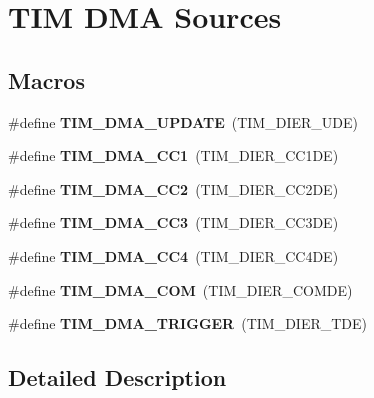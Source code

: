 \hypertarget{group___t_i_m___d_m_a__sources}{}\section{T\+IM D\+MA Sources}
\label{group___t_i_m___d_m_a__sources}
\subsection*{Macros}
\begin{DoxyCompactItemize}
\item 
\mbox{\label{group___t_i_m___d_m_a__sources_ga45816ad15a4f533027eb202ac0b9aaf5}} 
\#define {\bfseries T\+I\+M\+\_\+\+D\+M\+A\+\_\+\+U\+P\+D\+A\+TE}~(T\+I\+M\+\_\+\+D\+I\+E\+R\+\_\+\+U\+DE)
\item 
\mbox{\label{group___t_i_m___d_m_a__sources_ga33b93e8bb82fe8e167b9e9c962c54f83}} 
\#define {\bfseries T\+I\+M\+\_\+\+D\+M\+A\+\_\+\+C\+C1}~(T\+I\+M\+\_\+\+D\+I\+E\+R\+\_\+\+C\+C1\+DE)
\item 
\mbox{\label{group___t_i_m___d_m_a__sources_ga792f73196a8e7424655592097d7a3fd5}} 
\#define {\bfseries T\+I\+M\+\_\+\+D\+M\+A\+\_\+\+C\+C2}~(T\+I\+M\+\_\+\+D\+I\+E\+R\+\_\+\+C\+C2\+DE)
\item 
\mbox{\label{group___t_i_m___d_m_a__sources_ga3eb2dadbd3109bced45935fb53deeee1}} 
\#define {\bfseries T\+I\+M\+\_\+\+D\+M\+A\+\_\+\+C\+C3}~(T\+I\+M\+\_\+\+D\+I\+E\+R\+\_\+\+C\+C3\+DE)
\item 
\mbox{\label{group___t_i_m___d_m_a__sources_ga59495cf79894dfe5e5b2029863aed956}} 
\#define {\bfseries T\+I\+M\+\_\+\+D\+M\+A\+\_\+\+C\+C4}~(T\+I\+M\+\_\+\+D\+I\+E\+R\+\_\+\+C\+C4\+DE)
\item 
\mbox{\label{group___t_i_m___d_m_a__sources_gac5f4c56e944bda8ba0c23b97275020ba}} 
\#define {\bfseries T\+I\+M\+\_\+\+D\+M\+A\+\_\+\+C\+OM}~(T\+I\+M\+\_\+\+D\+I\+E\+R\+\_\+\+C\+O\+M\+DE)
\item 
\mbox{\label{group___t_i_m___d_m_a__sources_ga21912fd910242e0f63bf9b0953e41c63}} 
\#define {\bfseries T\+I\+M\+\_\+\+D\+M\+A\+\_\+\+T\+R\+I\+G\+G\+ER}~(T\+I\+M\+\_\+\+D\+I\+E\+R\+\_\+\+T\+DE)
\end{DoxyCompactItemize}


\subsection{Detailed Description}
